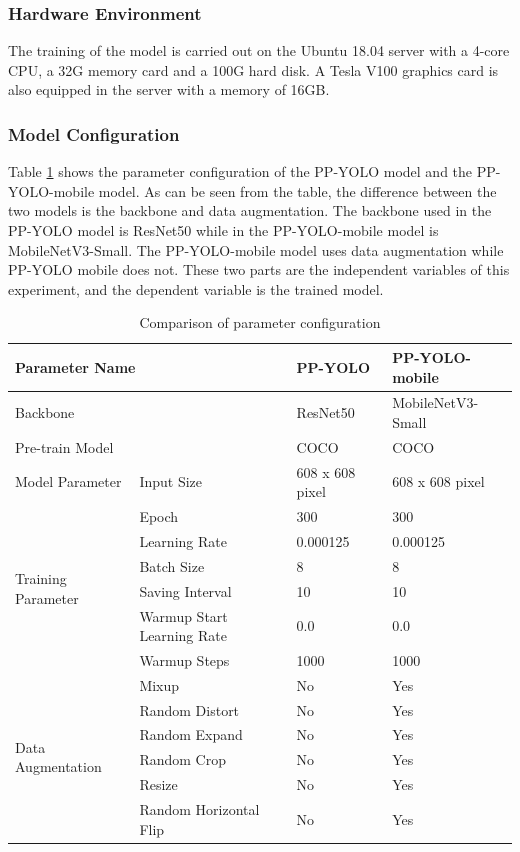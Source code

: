 \documentclass[sensors,article,submit,moreauthors,pdftex]{Definitions/mdpi}
\begin{document}
\begin{paracol}{2}
\subsubsection{Hardware Environment}

The training of the model is carried out on the Ubuntu 18.04 server with a 4-core CPU, a 32G memory card and a 100G hard disk. A Tesla V100 graphics card is also equipped in the server with a memory of 16GB.


\subsubsection{Model Configuration}

Table \ref{tbl:Parameter} shows the parameter configuration of the PP-YOLO model and the PP-YOLO-mobile model. As can be seen from the table, the difference between the two models is the backbone and data augmentation. The backbone used in the PP-YOLO model is ResNet50 while in the PP-YOLO-mobile model is MobileNetV3-Small. The PP-YOLO-mobile model uses data augmentation while PP-YOLO mobile does not. These two parts are the independent variables of this experiment, and the dependent variable is the trained model.

\end{paracol}
\begin{table}[H]
\centering
\caption{Comparison of parameter configuration}
\begin{tabular}{llll} 
\toprule
\multicolumn{2}{l}{\textbf{Parameter Name}}&\textbf{PP-YOLO}&\textbf{PP-YOLO-mobile}\\
\midrule
\multicolumn{2}{l}{Backbone} & ResNet50 & MobileNetV3-Small \\
\multicolumn{2}{l}{Pre-train Model} & COCO & COCO \\
\cmidrule(r){1-4}

\multirow{1}{*}{Model Parameter} 
& Input Size & 608 x 608 pixel  & 608 x 608 pixel  \\
\cmidrule(r){1-4}

\multirow{6}{*}{Training Parameter} 
& Epoch& 300  & 300  \\
& Learning Rate & 0.000125 & 0.000125  \\
& Batch Size & 8 & 8 \\
& Saving Interval & 10 & 10 \\
& Warmup Start Learning Rate & 0.0 & 0.0 \\
& Warmup Steps & 1000 & 1000 \\
\cmidrule(r){1-4}

\multirow{6}{*}{Data Augmentation} 
& Mixup& No  & Yes  \\
& Random Distort & No & Yes  \\
& Random Expand & No & Yes \\
& Random Crop  & No & Yes \\
& Resize & No & Yes \\
& Random Horizontal Flip & No & Yes \\

\bottomrule
\end{tabular}
\label{tbl:Parameter}
\end{table}
\end{document}
